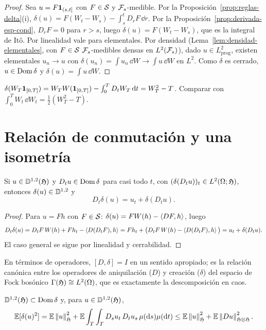 \begin{proof}
Sea $u=F\mathbf{1}_{(s,t]}$ con $F\in\mathcal{S}$ y $\mathcal{F}_s$-medible. Por la Proposición~\ref{prop:reglas-delta}(i), $\delta(u)=
F(W_t-W_s)-\int_s^tD_rF\,\dd r$. Por la Proposición~\ref{prop:derivada-esp-cond}, $D_rF=0$ para $r>s$, luego $\delta(u)=F(W_t-W_s)$,
que es la integral de Itô. Por linealidad vale para elementales. Por densidad (Lema~\ref{lem:densidad-elementales}, con
$F\in\mathcal{S}$ $\mathcal{F}_s$-medibles densas en $L^2(\mathcal{F}_s)$), dado $u\in L^2_{\mathrm{prog}}$, existen elementales $u_n\to u$ con
$\delta(u_n)=\int u_n\,\dd W\to\int u\,\dd W$ en $L^2$. Como $\delta$ es cerrado, $u\in\operatorname{Dom}\delta$ y $\delta(u)=\int u\,\dd W$.
\end{proof}

\begin{ejemplo}
$\delta(W_T\mathbf{1}_{[0,T]})=W_TW(\mathbf{1}_{[0,T]})-\int_0^TD_tW_T\,\mathrm{d} t=W_T^2-T$.
Comparar con $\int_0^TW_t\,\dd W_t=\frac12(W_T^2-T)$.
\end{ejemplo}

\section{Relación de conmutación y una isometría}

\begin{proposicion}\label{prop:heisenberg}
Si $u\in\mathbb{D}^{1,2}(\mathfrak{H})$ y $D_tu\in\operatorname{Dom}\delta$ para casi todo $t$,
con $(\delta(D_tu))_t\in L^2(\Omega;\mathfrak{H})$, entonces $\delta(u)\in\mathbb{D}^{1,2}$ y
\[
  D_t\delta(u)=u_t+\delta(D_tu).
\]
\end{proposicion}

\begin{proof}
Para $u=Fh$ con $F\in\mathcal{S}$: $\delta(u)=FW(h)-\left\langle DF, h\right\rangle$, luego
\[
  D_t\delta(u)=D_tF\,W(h)+Fh_t-\left\langle D(D_tF), h\right\rangle=Fh_t+\big(D_tF\,W(h)-\left\langle D(D_tF), h\right\rangle\big)=u_t+\delta(D_tu).
\]
El caso general se sigue por linealidad y cerrabilidad.
\end{proof}

En términos de operadores, $[D,\delta]=I$ en un sentido apropiado; es la relación canónica entre
los operadores de aniquilación ($D$) y creación ($\delta$) del espacio de Fock bosónico $\Gamma(\mathfrak{H})\cong L^2(\Omega)$,
que es exactamente la descomposición en caos.

\begin{teorema}\label{teo:isometria-skorokhod}
$\mathbb{D}^{1,2}(\mathfrak{H})\subset\operatorname{Dom}\delta$ y, para $u\in\mathbb{D}^{1,2}(\mathfrak{H})$,
\[
  \mathbb{E}[\delta(u)^2]=\mathbb{E}\left\lVert u\right\rVert_{\mathfrak{H}}^2+\mathbb{E}\int_T\int_TD_su_t\,D_tu_s\,\mu(\mathrm{d} s)\mu(\mathrm{d} t)\le\mathbb{E}\left\lVert u\right\rVert_{\mathfrak{H}}^2+\mathbb{E}\left\lVert Du\right\rVert^2_{\mathfrak{H}\otimes\mathfrak{H}}.
\]
\end{teorema}

